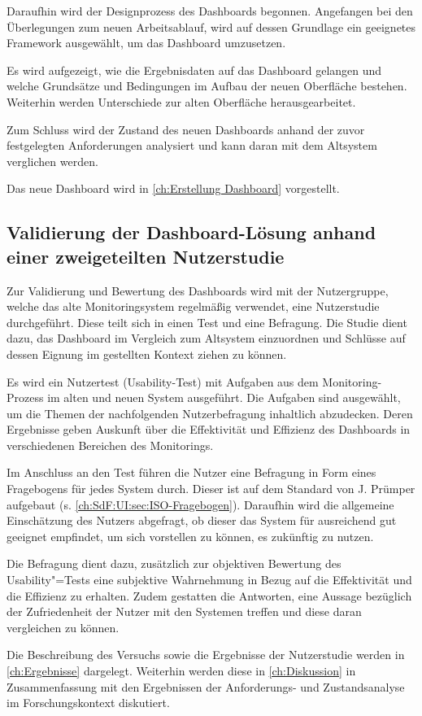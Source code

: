 Daraufhin wird der Designprozess des Dash\-boards begonnen. Angefangen bei den Überlegungen zum neuen Arbeitsablauf, wird auf dessen Grundlage ein geeignetes Framework ausgewählt, um das Dash\-board umzusetzen.

Es wird aufgezeigt, wie die Ergebnisdaten auf das Dash\-board gelangen und welche Grundsätze und Bedingungen im Aufbau der neuen Oberfläche bestehen. Weiterhin werden Unterschiede zur alten Oberfläche herausgearbeitet.

Zum Schluss wird der Zustand des neuen Dash\-boards anhand der zuvor festgelegten Anforderungen analysiert und kann daran mit dem Altsystem verglichen werden.

Das neue Dash\-board wird in \autoref{ch:Erstellung Dashboard} vorgestellt.

\subsection{Validierung der Dashboard-Lösung anhand einer zweigeteilten Nutzerstudie}

Zur Validierung und Bewertung des Dash\-boards wird mit der Nutzergruppe, welche das alte Monitoringsystem regelmäßig verwendet, eine Nutzerstudie durchgeführt. Diese teilt sich in einen Test und eine Befragung. Die Studie dient dazu, das Dash\-board im Vergleich zum Altsystem einzuordnen und Schlüsse auf dessen Eignung im gestellten Kontext ziehen zu können.

Es wird ein Nutzertest (Usability-Test) mit Aufgaben aus dem Monitoring-Prozess im alten und neuen System ausgeführt. Die Aufgaben sind ausgewählt, um die Themen der nachfolgenden Nutzerbefragung inhaltlich abzudecken.
Deren Ergebnisse geben Auskunft über die Effektivität und Effizienz des Dash\-boards in verschiedenen Bereichen des Monitorings.

Im Anschluss an den Test führen die Nutzer eine Befragung in Form eines Fragebogens für jedes System durch. Dieser ist auf dem Standard von J. Prümper aufgebaut %
(s. \autoref{ch:SdF:UI:sec:ISO-Fragebogen}).
Daraufhin wird die allgemeine Einschätzung des Nutzers abgefragt, ob dieser das System für ausreichend gut geeignet empfindet, um sich vorstellen zu können, es zukünftig zu nutzen.

Die Befragung dient dazu, zusätzlich zur objektiven Bewertung des Usability"=Tests eine subjektive Wahrnehmung in Bezug auf die Effektivität und die Effizienz zu erhalten. Zudem gestatten die Antworten, eine Aussage bezüglich der Zufriedenheit der Nutzer mit den Systemen treffen und diese daran vergleichen zu können.

Die Beschreibung des Versuchs sowie die Ergebnisse der Nutzerstudie werden in \autoref{ch:Ergebnisse} dargelegt. Weiterhin werden diese in \autoref{ch:Diskussion} in Zusammenfassung mit den Ergebnissen der Anforderungs- und Zustandsanalyse im Forschungskontext diskutiert.
